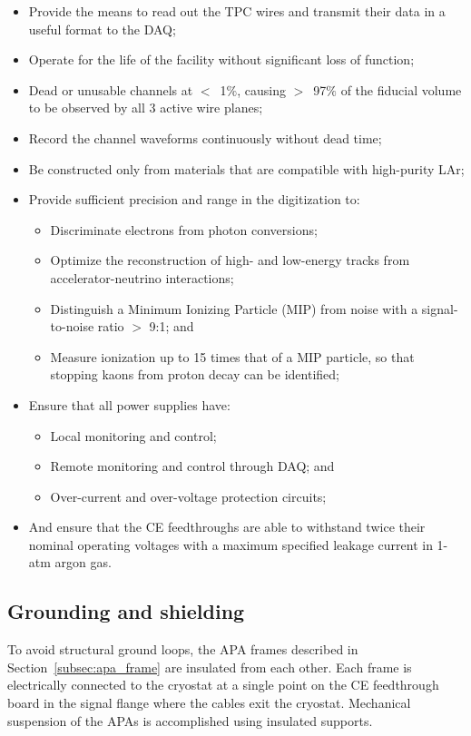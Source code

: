 \begin{itemize}	
\item Provide the means to read out the TPC wires and transmit their data in a useful format to the DAQ;
\item Operate for the life of the facility without significant loss of function;
\item Dead or unusable channels at $<$~1$\%$, causing $>$~97$\%$ of the fiducial volume to be observed by all 3 active wire planes;
\item Record the channel waveforms continuously without dead time;
\item Be constructed only from materials that are compatible with high-purity LAr;
\item Provide sufficient precision and range in the digitization to:
\begin{itemize}
\item Discriminate electrons from photon conversions;
\item Optimize the reconstruction of high- and low-energy tracks from accelerator-neutrino interactions;
\item Distinguish a Minimum Ionizing Particle (MIP) from noise with a signal-to-noise ratio $>$ 9:1; and
\item Measure ionization up to 15 times that of a MIP particle, so that stopping kaons from proton decay can be identified;
\end{itemize}
\item Ensure that all power supplies have: 
\begin{itemize}
\item Local monitoring and control;
\item Remote monitoring and control through DAQ; and
\item Over-current and over-voltage protection circuits;
\end{itemize}
\item And ensure that the CE feedthroughs are able to withstand twice their nominal operating voltages 
with a maximum specified leakage current in 1-atm argon gas.
\end{itemize}


\subsection{Grounding and shielding}
\label{subsec:groundshield}

To avoid structural ground loops, the APA frames described in Section~\ref{subsec:apa_frame} 
are insulated from each other. Each frame is electrically connected to the cryostat at a single 
point on the CE feedthrough board in the signal flange where the cables exit the cryostat. Mechanical suspension of the APAs 
is accomplished using insulated supports. 

